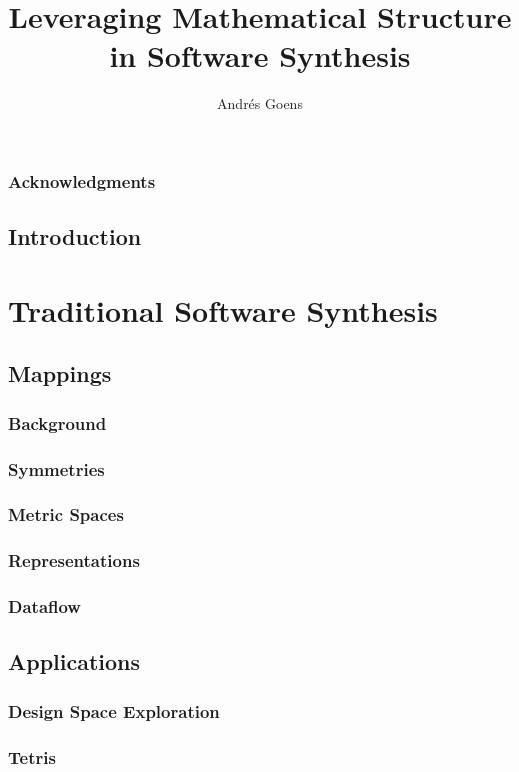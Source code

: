 \documentclass{report}
\title{Leveraging Mathematical Structure in Software Synthesis}
\author{Andr\'{e}s Goens}
\begin{document}
\date{}

\maketitle
\tableofcontents
\clearpage
\section*{Acknowledgments}


\chapter{Introduction}

\part{Traditional Software Synthesis}

\chapter{Mappings}

\section{Background}
\section{Symmetries}
\section{Metric Spaces}
\section{Representations}
\section{Dataflow}

\chapter{Applications}

\section{Design Space Exploration}
\section{Tetris}
\end{document}

